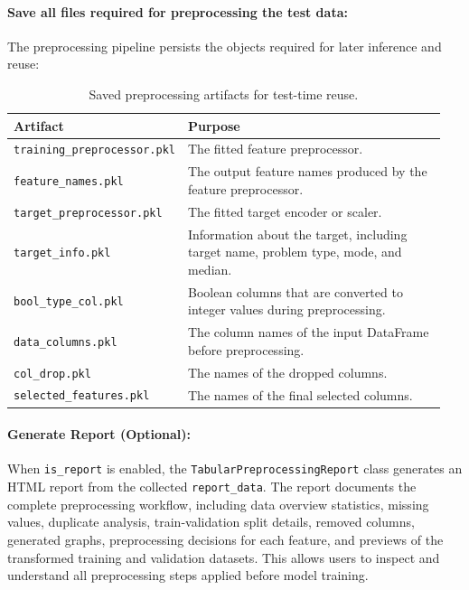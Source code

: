 \paragraph{Save all files required for preprocessing the test data:}\par
The preprocessing pipeline persists the objects required for later inference and reuse:

\begin{table}[H]
\centering
\caption{Saved preprocessing artifacts for test-time reuse.}
\begin{tabular}{p{0.30\linewidth}p{0.65\linewidth}}
\toprule
\textbf{Artifact} & \textbf{Purpose}\\
\midrule
\texttt{training\_preprocessor.}\newline\texttt{pkl} & The fitted feature preprocessor.\\
\texttt{feature\_names.pkl} & The output feature names produced by the feature preprocessor.\\
\texttt{target\_preprocessor.}\newline\texttt{pkl} & The fitted target encoder or scaler.\\
\texttt{target\_info.pkl} & Information about the target, including target name, problem type, mode, and median.\\
\texttt{bool\_type\_col.pkl} & Boolean columns that are converted to integer values during preprocessing.\\
\texttt{data\_columns.pkl} & The column names of the input DataFrame before preprocessing.\\
\texttt{col\_drop.pkl} & The names of the dropped columns.\\
\texttt{selected\_features.pkl} & The names of the final selected columns.\\
\bottomrule
\end{tabular}
\end{table}
\vspace{2cm}
\paragraph{Generate Report (Optional):}\par
When \texttt{is\_report} is enabled, the \texttt{TabularPreprocessingReport} class generates an HTML report from the collected \texttt{report\_data}. The report documents the complete preprocessing workflow, including data overview statistics, missing values, duplicate analysis, train-validation split details, removed columns, generated graphs, preprocessing decisions for each feature, and previews of the transformed training and validation datasets. This allows users to inspect and understand all preprocessing steps applied before model training.
\vspace{1cm}
